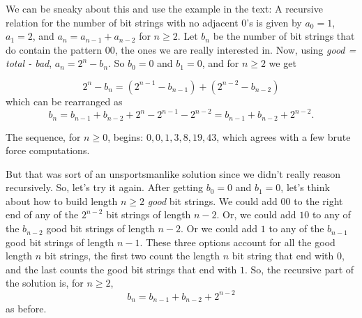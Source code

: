 \begin{Solution}{34.4}

We can be sneaky about this and use the example in the text: A recursive relation for the number of bit strings
with no adjacent $0$'s is given by $a_0 =1$, $a_1 = 2$, and $a_n = a_{n-1}+a_{n-2}$ for $n\geq 2$. 
Let $b_n$ be the number of bit strings that do contain the pattern $00$, the ones we are really interested in. 
Now, using {\it good = total - bad}, $a_n = 2^n - b_n$.  So $b_0 = 0$ and $b_1 = 0$, and for $n\geq 2$ we get

\[
2^n - b_n = (2^{n-1} - b_{n-1}) + (2^{n-2} - b_{n-2})
\]
which can be rearranged as
\[
b_n = b_{n-1} + b_{n-2} + 2^n - 2^{n-1} - 2^{n-2} = b_{n-1} + b_{n-2} + 2^{n-2}.
\]

The sequence, for $n\geq 0$, begins: $0, 0, 1, 3, 8, 19, 43$, which agrees with a few brute force computations.

But that was sort of an unsportsmanlike solution since we didn't really reason recursively. So, let's try it again.
After getting $b_0 = 0$ and $b_1= 0$, let's think about how to build length $n\geq 2$ {\it good} bit strings. We could add $00$ to the right end of any of the $2^{n-2}$ bit strings of length $n-2$. Or, we could add $10$ 
to any of the $b_{n-2}$  good bit strings of length $n-2$. Or we could add $1$ to any of the $b_{n-1}$ good bit strings of length $n-1$. These three options account for all the good length $n$ bit strings,  the first two count the length $n$ bit string that end with $0$, and the last counts the good bit strings that end with $1$. So, the recursive part of the solution is, for $n\geq 2$,
\[
b_n = b_{n-1}+b_{n-2} + 2^{n-2}
\]
as before.

\end{Solution}

